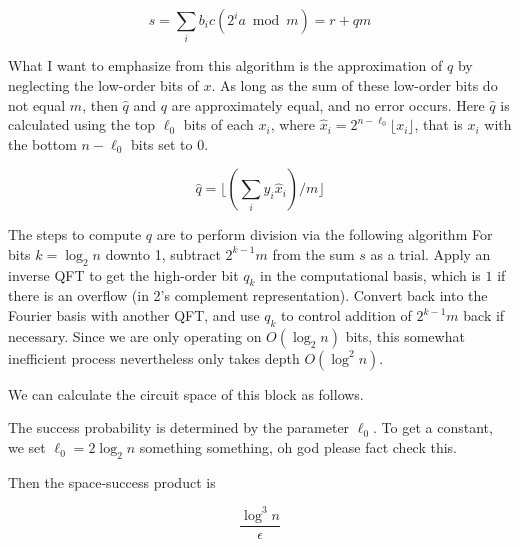 \begin{equation}
s = \sum_i b_i c (2^i a \bmod m) = r + qm
\end{equation}

What I want to emphasize from this algorithm is the approximation of
$q$ by neglecting the low-order bits of $x$. As long as the sum of these
low-order bits do not equal $m$, then $\hat{q}$ and $q$ are approximately
equal, and no error occurs. Here $\hat{q}$ is calculated using the
top $\ell_0$ bits of each $x_i$, where
$\hat{x}_i = 2^{n-\ell_0}\lfloor x_i \rfloor$, that is $x_i$ with the
bottom $n-\ell_0$ bits set to 0.

\begin{equation}
\hat{q} = \lfloor (\sum_{i} y_i \hat{x}_i ) / m \rfloor
\end{equation}

The steps to compute $q$ are to perform division via the following algorithm
For bits $k = \log_2 n$ downto 1, subtract $2^{k-1}m$ from the sum $s$ as a
trial. Apply an inverse QFT to get the high-order bit
$q_k$ in the computational
basis, which is $1$ if there is an overflow (in 2's complement representation).
Convert back into the Fourier basis with another QFT, and use $q_k$ to
control addition of $2^{k-1}m$ back if necessary.
Since we are only operating on $O(\log_2 n)$ bits, this somewhat inefficient
process nevertheless only takes depth $O(\log^2 n)$.

We can calculate the circuit space of this block as follows.

The success probability is determined by the parameter $\ell_0$. To get
a constant, we set $\ell_0 = 2\log_2 n$ something something, oh god please
fact check this.

Then the space-success product is

\begin{equation}
\frac{\log^3 n}{\epsilon}
\end{equation}